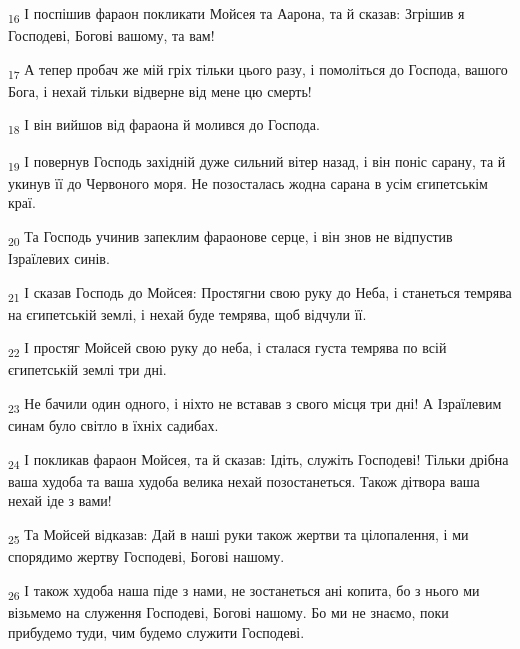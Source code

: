 \begin{tcolorbox}
\textsubscript{16} І поспішив фараон покликати Мойсея та Аарона, та й сказав: Згрішив я Господеві, Богові вашому, та вам!
\end{tcolorbox}
\begin{tcolorbox}
\textsubscript{17} А тепер пробач же мій гріх тільки цього разу, і помоліться до Господа, вашого Бога, і нехай тільки відверне від мене цю смерть!
\end{tcolorbox}
\begin{tcolorbox}
\textsubscript{18} І він вийшов від фараона й молився до Господа.
\end{tcolorbox}
\begin{tcolorbox}
\textsubscript{19} І повернув Господь західній дуже сильний вітер назад, і він поніс сарану, та й укинув її до Червоного моря. Не позосталась жодна сарана в усім єгипетськім краї.
\end{tcolorbox}
\begin{tcolorbox}
\textsubscript{20} Та Господь учинив запеклим фараонове серце, і він знов не відпустив Ізраїлевих синів.
\end{tcolorbox}
\begin{tcolorbox}
\textsubscript{21} І сказав Господь до Мойсея: Простягни свою руку до Неба, і станеться темрява на єгипетській землі, і нехай буде темрява, щоб відчули її.
\end{tcolorbox}
\begin{tcolorbox}
\textsubscript{22} І простяг Мойсей свою руку до неба, і сталася густа темрява по всій єгипетській землі три дні.
\end{tcolorbox}
\begin{tcolorbox}
\textsubscript{23} Не бачили один одного, і ніхто не вставав з свого місця три дні! А Ізраїлевим синам було світло в їхніх садибах.
\end{tcolorbox}
\begin{tcolorbox}
\textsubscript{24} І покликав фараон Мойсея, та й сказав: Ідіть, служіть Господеві! Тільки дрібна ваша худоба та ваша худоба велика нехай позостанеться. Також дітвора ваша нехай іде з вами!
\end{tcolorbox}
\begin{tcolorbox}
\textsubscript{25} Та Мойсей відказав: Дай в наші руки також жертви та цілопалення, і ми спорядимо жертву Господеві, Богові нашому.
\end{tcolorbox}
\begin{tcolorbox}
\textsubscript{26} І також худоба наша піде з нами, не зостанеться ані копита, бо з нього ми візьмемо на служення Господеві, Богові нашому. Бо ми не знаємо, поки прибудемо туди, чим будемо служити Господеві.
\end{tcolorbox}
